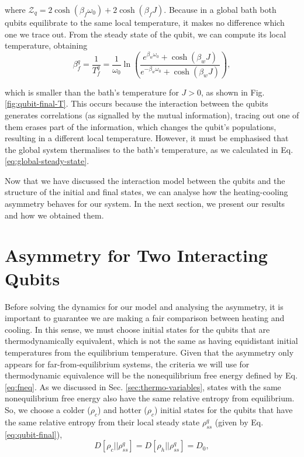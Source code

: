 \noindent where $\mathcal{Z}_q = 2 \cosh(\beta_f \omega_0) + 2 \cosh(\beta_f J)$. Because in a global bath both qubits equilibrate to the same local temperature, it makes no difference which one we trace out. From the steady state of the qubit, we can compute its local temperature, obtaining
\begin{equation}
    \beta_{f}^{q} = \frac{1}{T^{q}_{f}} = \frac{1}{\omega_0} \ln \left( \frac{e^{\beta_w \omega_0} + \cosh (\beta_w J)}{e^{-\beta_w \omega_0} + \cosh (\beta_w J)} \right),
    \label{eq:qubit-final-T}
\end{equation}

\noindent which is smaller than the bath's temperature for $J>0$, as shown in Fig. \ref{fig:qubit-final-T}. This occurs because the interaction between the qubits generates correlations (as signalled by the mutual information), tracing out one of them erases part of the information, which changes the qubit's populations, resulting in a different local temperature. However, it must be emphasised that the global system thermalises to the bath's temperature, as we calculated in Eq. \eqref{eq:global-steady-state}.

Now that we have discussed the interaction model between the qubits and the structure of the initial and final states, we can analyse how the heating-cooling asymmetry behaves for our system. In the next section, we present our results and how we obtained them. 




\section{Asymmetry for Two Interacting Qubits}\label{sec:asymmetry-qubit}

Before solving the dynamics for our model and analysing the asymmetry, it is important to guarantee we are making a fair comparison between heating and cooling. In this sense, we must choose initial states for the qubits that are thermodynamically equivalent, which is not the same as having equidistant initial temperatures from the equilibrium temperature. Given that the asymmetry only appears for far-from-equilibrium systems, the criteria we will use for thermodynamic equivalence will be the nonequilibrium free energy defined by Eq. \eqref{eq:fneq}. As we discussed in Sec. \ref{sec:thermo-variables}, states with the same nonequilibrium free energy also have the same relative entropy from equilibrium. So, we choose a colder ($\rho_c$) and hotter ($\rho_c$) initial states for the qubits that have the same relative entropy from their local steady state $\rho_{ss}^q$ (given by Eq. \eqref{eq:qubit-final}),
\begin{equation}
    D[\rho_c || \rho_{ss}^{q}] = D[\rho_h || \rho_{ss}^{q}] = D_0,
    \label{eq:same-D-qubit}
\end{equation}

